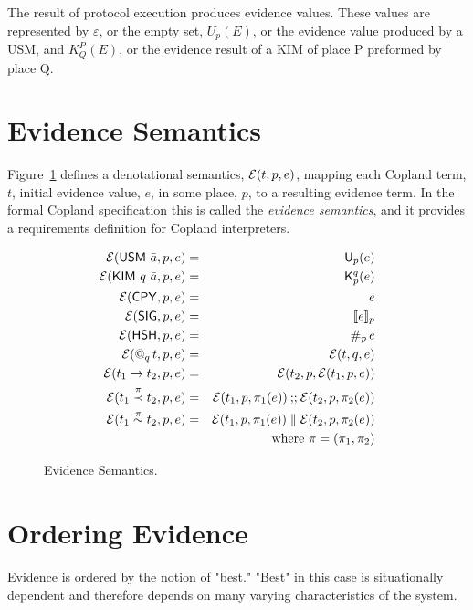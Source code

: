 \documentclass[10pt]{report}
\begin{document}
The result of protocol execution produces evidence 
values. These values are represented by $\varepsilon$, 
or the empty set, $U_p(E)$, or the evidence value 
produced by a USM, and $K_Q^P(E)$, or the evidence 
result of a KIM of place P preformed by place Q. 

\section{Evidence Semantics}

Figure~\ref{fig:evidence-semantics} defines a denotational semantics,
$\eval{t}{p}{e}$, mapping each Copland term, $t$, initial evidence
value, $e$, in some place, $p$, to a resulting evidence term. In the formal
Copland specification this is called the \emph{evidence semantics}, and
it provides a requirements definition for Copland interpreters. 

\newpage

\begin{figure}
  \begin{eqnarray*}
    \eval{\usme{\bar{a}}}{p}{e}&=&\Ue{\bar{a}}{p}{e}\\
    \eval{\kim{q}{\bar{a}}}{p}{e}&=&\Ke{q}{\bar{a}}{p}{e}\\
    \eval{\cpy}{p}{e}&=&e\\
    \eval{\sig}{p}{e}&=&\sign{e}{p}\\
    \eval{\hsh}{p}{e}&=&\hash{p}{e}\\
    \eval{\at{q}{t}}{p}{e}&=&\eval{t}{q}{e}\\
    \eval{t_1\linseqe t_2}{p}{e}&=&\eval{t_2}{p}{\eval{t_1}{p}{e}}\\
    \eval{t_1\stackrel{\pi}{\linseq} t_2}{p}{e}&=&\eval{t_1}{p}{\pi_1(e)}\seqe
      \eval{t_2}{p}{\pi_2(e)} \\
    \eval{t_1\stackrel{\pi}{\linpar} t_2}{p}{e}&=&\eval{t_1}{p}{\pi_1(e)}\pare
       \eval{t_2}{p}{\pi_2(e)} \\
    & & \mbox{ where $\pi=(\pi_1,\pi_2)$}
  \end{eqnarray*}
  \vspace{-1ex}
  \caption{Evidence Semantics.}
  \label{fig:evidence-semantics}
\end{figure}

\section{Ordering Evidence}

Evidence is ordered by the notion of "best." "Best" in this case is 
situationally dependent and therefore depends on many varying 
characteristics of the system. 
\end{document}
